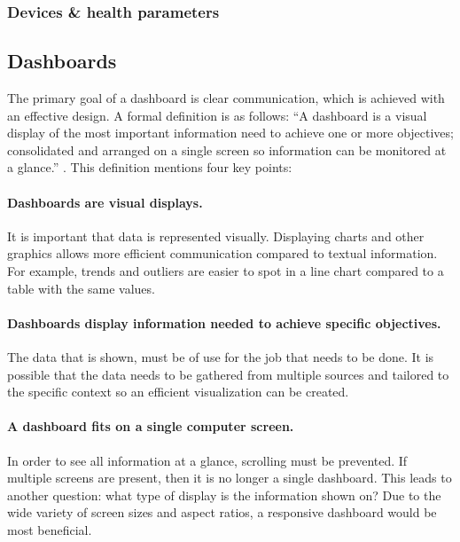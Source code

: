         \subsubsection{Devices \& health parameters}


    \subsection{Dashboards} \label{2_dashboards}

    The primary goal of a dashboard is clear communication, which is achieved with an effective design. A formal definition is as follows: ``A dashboard is a visual display of the most important information need to achieve one or more objectives; consolidated and arranged on a single screen so information can be monitored at a glance.'' \cite{dashboard}. This definition mentions four key points:

    \paragraph{Dashboards are visual displays.} It is important that data is represented visually. Displaying charts and other graphics allows more efficient communication compared to textual information. For example, trends and outliers are easier to spot in a line chart compared to a table with the same values.

    \paragraph{Dashboards display information needed to achieve specific objectives.} The data that is shown, must be of use for the job that needs to be done. It is possible that the data needs to be gathered from multiple sources and tailored to the specific context so an efficient visualization can be created.

    \paragraph{A dashboard fits on a single computer screen.} In order to see all information at a glance, scrolling must be prevented. If multiple screens are present, then it is no longer a single dashboard. This leads to another question: what type of display is the information shown on? Due to the wide variety of screen sizes and aspect ratios, a responsive dashboard would be most beneficial.

